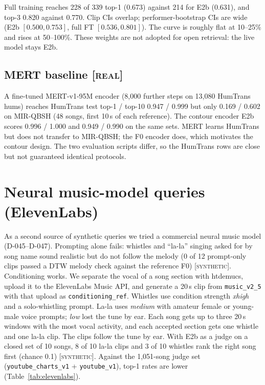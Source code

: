 \documentclass[11pt]{article}
\newcommand{\syn}{\textsc{[synthetic]}}
\newcommand{\real}{\textsc{[real]}}
\begin{document}
Full training reaches 228 of 339 top-1 (0.673) against 214 for E2b (0.631), and top-3 0.820 against 0.770. Clip CIs overlap; performer-bootstrap CIs are wide (E2b $[0.500, 0.753]$, full FT $[0.536, 0.801]$). The curve is roughly flat at 10--25\% and rises at 50--100\%. These weights are not adopted for open retrieval: the live model stays E2b.

\subsection{MERT baseline \real}

A fine-tuned MERT-v1-95M encoder (8,000 further steps on 13,080 HumTrans hums) reaches HumTrans test top-1 / top-10 0.947 / 0.999 but only 0.169 / 0.602 on MIR-QBSH (48 songs, first 10\,s of each reference). The contour encoder E2b scores 0.996 / 1.000 and 0.949 / 0.990 on the same sets. MERT learns HumTrans but does not transfer to MIR-QBSH; the F0 encoder does, which motivates the contour design. The two evaluation scripts differ, so the HumTrans rows are close but not guaranteed identical protocols.

\section{Neural music-model queries (ElevenLabs)}\label{sec:elevenlabs}
As a second source of synthetic queries we tried a commercial neural music model (D-045--D-047). Prompting alone fails: whistles and ``la-la'' singing asked for by song name sound realistic but do not follow the melody (0 of 12 prompt-only clips passed a DTW melody check against the reference F0) \syn. Conditioning works. We separate the vocal of a song section with htdemucs, upload it to the ElevenLabs Music API, and generate a 20\,s clip from \texttt{music\_v2\_5} with that upload as \texttt{conditioning\_ref}. Whistles use condition strength \emph{xhigh} and a solo-whistling prompt. La-la uses \emph{medium} with amateur female or young-male voice prompts; \emph{low} lost the tune by ear. Each song gets up to three 20\,s windows with the most vocal activity, and each accepted section gets one whistle and one la-la clip. The clips follow the tune by ear. With E2b as a judge on a closed set of 10 songs, 8 of 10 la-la clips and 3 of 10 whistles rank the right song first (chance 0.1) \syn. Against the 1,051-song judge set (\texttt{youtube\_charts\_v1} + \texttt{youtube\_v1}), top-1 rates are lower (Table~\ref{tab:elevenlabs}).
\end{document}
